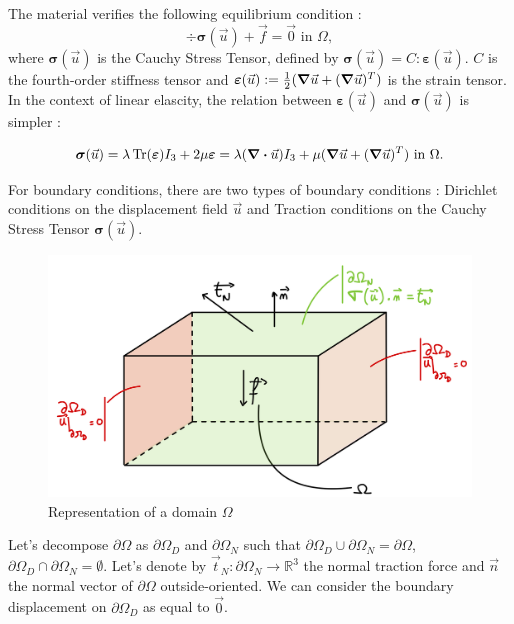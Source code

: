 \documentclass[a4paper,12pt,twoside]{report}
\newcommand{\mtr}{\mathbb{R}}
\begin{document}
The material verifies the following equilibrium condition : 
\begin{equation}
\label{eq:equilibrium}
    \div \boldsymbol{\sigma} (\vec u) + \vec f = \vec 0 \text{ in } \Omega,
\end{equation}
where $\boldsymbol{\sigma} (\vec u)$ is the Cauchy Stress Tensor, defined by $\boldsymbol{\sigma} (\vec u) = C : \boldsymbol{\varepsilon} (\vec u)$. $C$ is the fourth-order stiffness tensor and $\boldsymbol{\varepsilon} (\vec u) := \frac{1}{2}(\grad \vec u + (\grad \vec u)^T)$ is the strain tensor. In the context of linear elascity, the relation between $\boldsymbol{\varepsilon} (\vec u)$ and $\boldsymbol{\sigma} (\vec u)$ is simpler : 

\begin{equation}
\label{eq:hooklaw}
    \boldsymbol{\sigma} (\vec u) = \lambda \Tr(\boldsymbol{\varepsilon}) I_3 + 2\mu \boldsymbol \varepsilon = \lambda (\div \vec u) I_3 + \mu (\grad \vec u + (\grad \vec u)^T) \text{ in } \Omega.
\end{equation}

For boundary conditions, there are two types of boundary conditions : Dirichlet conditions on the displacement field $\vec u$ and Traction conditions on the Cauchy Stress Tensor $\boldsymbol \sigma (\vec u)$. 


\begin{figure}[!h]
	\centering
	\includegraphics[width=0.61\linewidth]{figures/omega_domain}
	\caption{Representation of a domain $\Omega$}
	\label{fig:omegadomain}
\end{figure}

Let's decompose $\partial \Omega$ as $\partial \Omega_D$ and $\partial \Omega_N$ such that $\partial \Omega_D \cup \partial \Omega_N = \partial \Omega$, $\partial \Omega_D \cap \partial \Omega_N = \emptyset$. Let's denote by $\vec t_N : \partial \Omega_N \rightarrow \mtr^3$ the normal traction force and $\vec n$ the normal vector of $\partial \Omega$ outside-oriented. We can consider the boundary displacement on $\partial \Omega_D$ as equal to $\vec 0$. 
\end{document}
